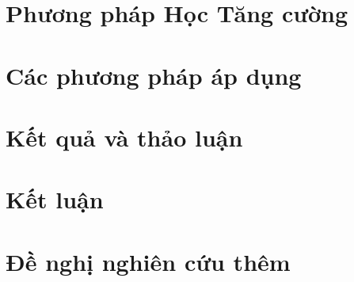\documentclass[12pt,oneside]{report}
\newcommand\blankpage{%
    \null
    \thispagestyle{empty}%
    \newpage}
\begin{document}
\chapter{Phương pháp Học Tăng cường}


\chapter{Các phương pháp áp dụng} \label{Chap3}


\chapter{Kết quả và thảo luận}\label{Chap4}


\chapter{Kết luận} 
%
\clearpage
\chapter{Đề nghị nghiên cứu thêm}
%
\medskip
\afterpage{\blankpage}





\end{document}

